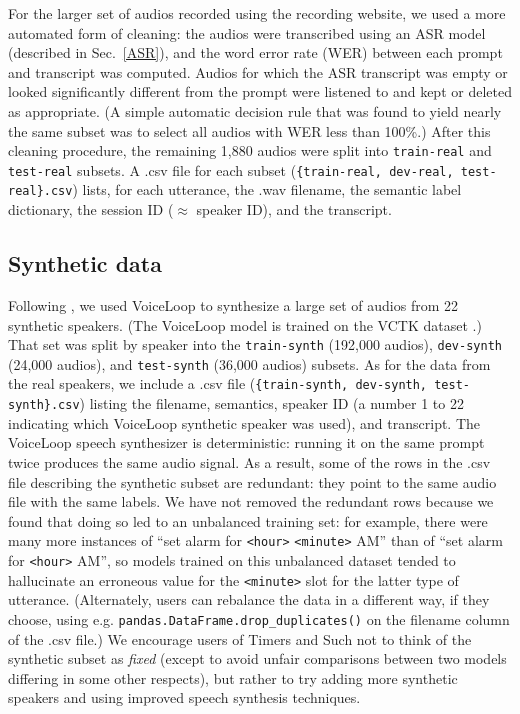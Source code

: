 \documentclass{article}
\begin{document}
For the larger set of audios recorded using the recording website, we used a more automated form of cleaning: the audios were transcribed using an ASR model (described in Sec.~\ref{ASR}), and the word error rate (WER) between each prompt and transcript was computed. Audios for which the ASR transcript was empty or looked significantly different from the prompt were listened to and kept or deleted as appropriate. 
(A simple automatic decision rule that was found to yield nearly the same subset was to select all audios with WER less than 100\%.) 
After this cleaning procedure, the remaining 1,880 audios were split into \texttt{train-real} and \texttt{test-real} subsets. A .csv file for each subset (\texttt{\{train-real, dev-real, test-real\}.csv}) lists, for each utterance, the .wav filename, the semantic label dictionary, the session ID ($\approx$ speaker ID), and the transcript.

\subsection{Synthetic data}
Following \cite{lugosch2020using}, we used VoiceLoop \cite{taigman2017voice} to synthesize a large set of audios from 22 synthetic speakers. (The VoiceLoop model is trained on the VCTK dataset \cite{veaux2017cstr}.) That set was split by speaker into the \texttt{train-synth} (192,000 audios), \texttt{dev-synth} (24,000 audios), and \texttt{test-synth} (36,000 audios) subsets. As for the data from the real speakers, we include a .csv file (\texttt{\{train-synth, dev-synth, test-synth\}.csv}) listing the filename, semantics, speaker ID (a number 1 to 22 indicating which VoiceLoop synthetic speaker was used), and transcript.
The VoiceLoop speech synthesizer is deterministic: running it on the same prompt twice produces the same audio signal. As a result, some of the rows in the .csv file describing the synthetic subset are redundant: they point to the same audio file with the same labels. We have not removed the redundant rows because we found that doing so led to an unbalanced training set: for example, there were many more instances of ``set alarm for \texttt{<hour>} \texttt{<minute>} AM'' than of ``set alarm for \texttt{<hour>} AM'', so models trained on this unbalanced dataset tended to hallucinate an erroneous value for the \texttt{<minute>} slot for the latter type of utterance. (Alternately, users can rebalance the data in a different way, if they choose, using e.g. \texttt{pandas.DataFrame.drop\_duplicates()} on the filename column of the .csv file.) 
We encourage users of Timers and Such not to think of the synthetic subset as \textit{fixed} (except to avoid unfair comparisons between two models differing in some other respects), but rather to try adding more synthetic speakers and using improved speech synthesis techniques. 
\end{document}
